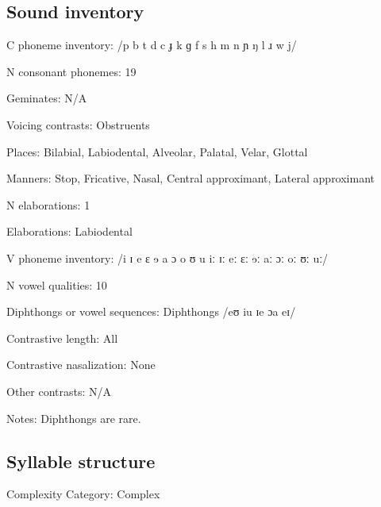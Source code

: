 {\subsection*{Sound inventory}
\begin{appendixdesc}

\item[C phoneme inventory:] /p b t d c ɟ k ɡ f s h m n ɲ ŋ l ɹ w j/

\item[N consonant phonemes:] 19

\item[Geminates:] N/A

\item[Voicing contrasts:] Obstruents

\item[Places:] Bilabial, Labiodental, Alveolar, Palatal, Velar, Glottal

\item[Manners:] Stop, Fricative, Nasal, Central approximant, Lateral approximant

\item[N elaborations:] 1

\item[Elaborations:] Labiodental

\item[V phoneme inventory:] /i ɪ e ɛ ɘ a ɔ o ʊ u iː ɪː eː ɛː ɘː aː ɔː oː ʊː uː/

\item[N vowel qualities:] 10

\item[Diphthongs or vowel sequences:] Diphthongs /eʊ iu ɪe ɔa eɪ/

\item[Contrastive length:] All

\item[Contrastive nasalization:] None

\item[Other contrasts:] N/A

\item[Notes:] Diphthongs are rare.
\end{appendixdesc}
\subsection*{Syllable structure}
\begin{appendixdesc}

\item[Complexity Category:] Complex


\end{appendixdesc}}
